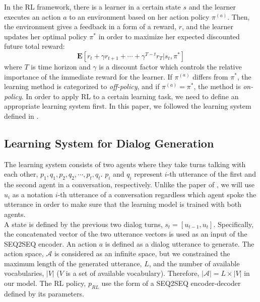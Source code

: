 In the RL framework, there is a learner in a certain state $s$ and the learner executes an action $a$ to an environment based on her action policy $\pi^{(a)}$. Then, the environment gives a feedback in a form of a reward, $r$, and the learner updates her optimal policy $\pi^*$ in order to maximize her expected discounted future total reward: 
\[
	\mathbf{E}[r_t + \gamma r_{t+1} + \cdots + \gamma^{T-t}r_T | s_t, \pi^* ]
\]
where $T$ is time horizon and $\gamma$ is a discount factor which controls the relative importance of the immediate reward for the learner. If $\pi^{(a)}$ differs from $\pi^*$, the learning method is categorized to \textit{off-policy}, and if $\pi^{(a)} = \pi^*$, the method is \textit{on-policy}. In order to apply RL to a certain learning task, we need to define an appropriate learning system first. In this paper, we followed the learning system defined in \cite{Li}. 
\subsection{Learning System for Dialog Generation}
The learning system consists of two agents where they take turns talking with each other, $p_1, q_1, p_2, q_2, \cdots, p_t, q_t$. $p_i$ and $q_i$ represent $i$-th utterance of the first and the second agent in a conversation, respectively. Unlike the paper of \cite{Li}, we will use $u_i$ as a notation $i$-th utterance of a conversation regardless which agent spoke the utterance in order to make sure that the learning model is trained with both agents. \\
A state is defined by the previous two dialog turns, $s_t = [u_{t-1}, u_t]$. Specifically, the concatenated vector of the two utterance vectors is used as an input of the SEQ2SEQ encoder. An action $a$ is defined as a dialog utterance to generate. The action space, $\mathcal{A}$ is considered as an infinite space, but we constrained the maximum length of the generated utterance, $L$, and the number of available vocabularies, $|V|$ ($V$ is a set of available vocabulary). Therefore, $|\mathcal{A}|=L\times |V|$ in our model. The RL policy, $p_{RL}$ use the form of a SEQ2SEQ encoder-decoder defined by its parameters. 

